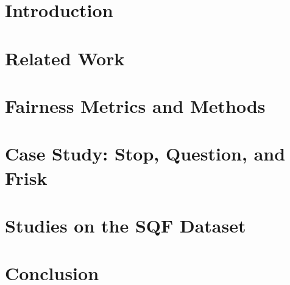 \documentclass[12pt]{article}
\begin{document}
\newpage
\tableofcontents
\newpage



    
\section{Introduction}

\section{Related Work}

\section{Fairness Metrics and Methods}
\label{sec:fairness_metrics_methods}


\section{Case Study: Stop, Question, and Frisk}
\label{sec:case_study}

\section{Studies on the SQF Dataset}
\label{sec:studies}

% 

\section{Conclusion}

\newpage

% 

% 
\newpage


\end{document}
